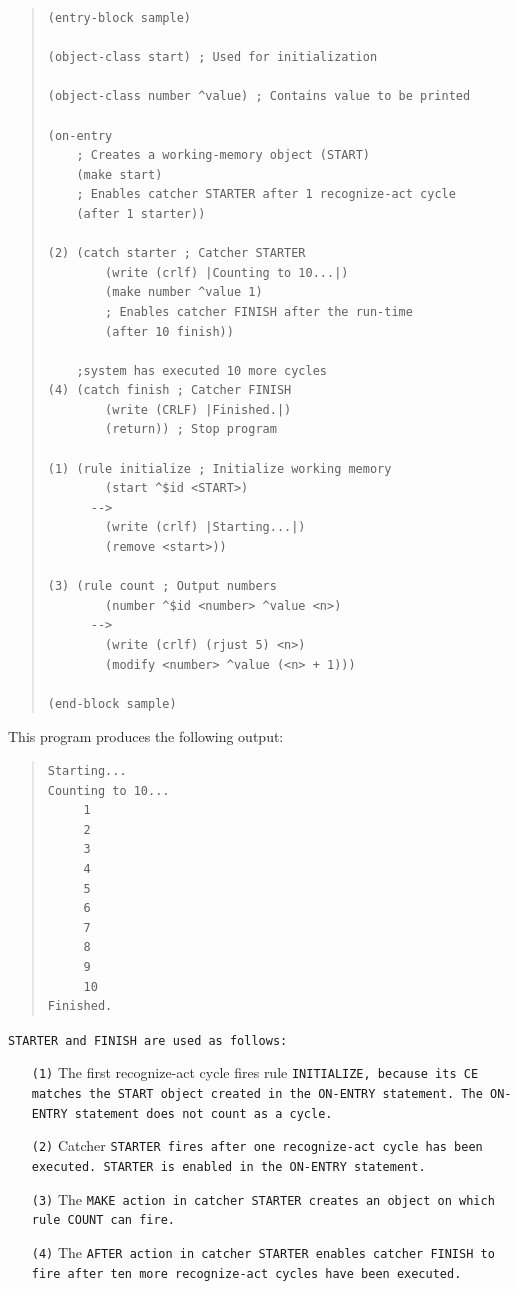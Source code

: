 \begin{quote}
\begin{verbatim}
(entry-block sample)

(object-class start) ; Used for initialization

(object-class number ^value) ; Contains value to be printed

(on-entry
    ; Creates a working-memory object (START)
    (make start)
    ; Enables catcher STARTER after 1 recognize-act cycle
    (after 1 starter))

(2) (catch starter ; Catcher STARTER
        (write (crlf) |Counting to 10...|)
        (make number ^value 1)
        ; Enables catcher FINISH after the run-time
        (after 10 finish))

    ;system has executed 10 more cycles
(4) (catch finish ; Catcher FINISH
        (write (CRLF) |Finished.|)
        (return)) ; Stop program

(1) (rule initialize ; Initialize working memory
        (start ^$id <START>)
      -->
        (write (crlf) |Starting...|)
        (remove <start>))

(3) (rule count ; Output numbers
        (number ^$id <number> ^value <n>)
      -->
        (write (crlf) (rjust 5) <n>)
        (modify <number> ^value (<n> + 1)))

(end-block sample)
\end{verbatim}
\end{quote}

This program produces the following output:

\begin{quote}
\begin{verbatim}
Starting...
Counting to 10...
     1
     2
     3
     4
     5
     6
     7
     8
     9
     10
Finished.
\end{verbatim}
\end{quote}

\tt{STARTER} and \tt{FINISH} are used as follows:
\begin{itemize}
\item[\tt{(1)}] The first recognize-act cycle fires rule
  \tt{INITIALIZE}, because its CE matches the \tt{START} object
  created in the \tt{ON-ENTRY} statement. The \tt{ON-ENTRY} statement
  does not count as a cycle.

\item[\tt{(2)}] Catcher \tt{STARTER} fires after one recognize-act
  cycle has been executed. \tt{STARTER} is enabled in the
  \tt{ON-ENTRY} statement.

\item[\tt{(3)}] The \tt{MAKE} action in catcher \tt{STARTER} creates
  an object on which rule \tt{COUNT} can fire.

\item[\tt{(4)}] The \tt{AFTER} action in catcher \tt{STARTER} enables
  catcher \tt{FINISH} to fire after ten more recognize-act cycles have
  been executed.
\end{itemize}


